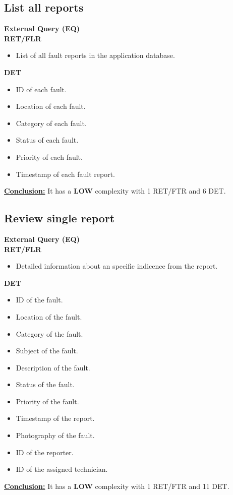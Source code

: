 \subsection{List all reports}
\textbf{External Query (EQ)} \\ 
\textbf{RET/FLR}
\begin{itemize}
\item List of all fault reports in the application database.
\end{itemize}
\textbf{DET}
\begin{itemize}
\item ID of each fault.
\item Location of each fault.
\item Category of each fault.
\item Status of each fault.
\item Priority of each fault.
\item Timestamp of each fault report.
\end{itemize}
\textbf{\underline{Conclusion:}} It has a \textbf{LOW} complexity with 1 RET/FTR and 6 DET.

\subsection{Review single report}
\textbf{External Query (EQ)} \\ 
\textbf{RET/FLR}
\begin{itemize}
\item Detailed information about an specific indicence from the report.
\end{itemize}
\textbf{DET}
\begin{itemize}
\item ID of the fault.
\item Location of the fault.
\item Category of the fault.
\item Subject of the fault.
\item Description of the fault.
\item Status of the fault.
\item Priority of the fault.
\item Timestamp of the report.
\item Photography of the fault.
\item ID of the reporter.
\item ID of the assigned technician.
\end{itemize}
\textbf{\underline{Conclusion:}} It has a \textbf{LOW} complexity with 1 RET/FTR and 11 DET.


